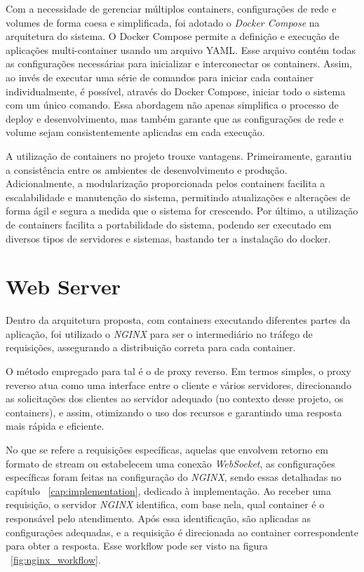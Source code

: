 Com a necessidade de gerenciar múltiplos containers, configurações de rede e volumes de forma coesa e simplificada, foi adotado o \textit{Docker Compose} na arquitetura do sistema. O Docker Compose permite a definição e execução de aplicações multi-container usando um arquivo YAML. Esse arquivo contém todas as configurações necessárias para inicializar e interconectar os containers. Assim, ao invés de executar uma série de comandos para iniciar cada container individualmente, é possível, através do Docker Compose, iniciar todo o sistema com um único comando. Essa abordagem não apenas simplifica o processo de deploy e desenvolvimento, mas também garante que as configurações de rede e volume sejam consistentemente aplicadas em cada execução.

A utilização de containers no projeto trouxe vantagens. Primeiramente, garantiu a consistência entre os ambientes de desenvolvimento e produção. Adicionalmente, a modularização proporcionada pelos containers facilita a escalabilidade e manutenção do sistema, permitindo atualizações e alterações de forma ágil e segura a medida que o sistema for crescendo. Por último, a utilização de containers facilita a portabilidade do sistema, podendo ser executado em diversos tipos de servidores e sistemas, bastando ter a instalação do docker.


\section{Web Server}\label{sec:webserver}

Dentro da arquitetura proposta, com containers executando diferentes partes da aplicação, 
foi utilizado o \textit{NGINX} para ser o intermediário no tráfego de requisições, assegurando a distribuição correta para cada container. 

O método empregado para tal é o de proxy reverso. Em termos simples, o proxy reverso atua como uma interface entre o cliente e vários servidores, direcionando as solicitações dos clientes ao servidor adequado  (no contexto desse projeto, os containers), e assim, otimizando o uso dos recursos e garantindo uma resposta mais rápida e eficiente.

No que se refere a requisições específicas, aquelas que envolvem retorno em formato de stream ou estabelecem uma conexão \textit{WebSocket}, as configurações específicas foram feitas na configuração do \textit{NGINX}, sendo essas detalhadas no capítulo ~\ref{cap:implementation},  dedicado à implementação. Ao receber uma requisição, o servidor \textit{NGINX} identifica, com base nela, qual container é o responsável pelo atendimento. Após essa identificação, são aplicadas as configurações adequadas, e a requisição é direcionada ao container correspondente para obter a resposta. Esse workflow pode ser visto na figura ~\ref{fig:nginx_workflow}.

